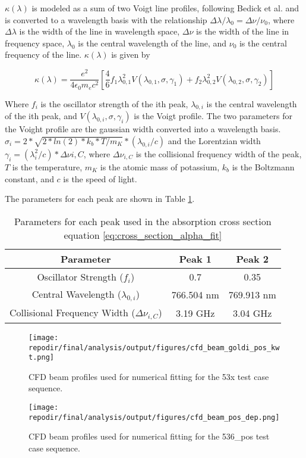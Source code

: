 $\kappa(\lambda)$ is modeled as a sum of two Voigt line profiles, following Bedick et al.\cite{bedickDeterminationElectricalConductivity2019} and is converted to a wavelength basis with the relationship $\Delta \lambda/\lambda_0 = \Delta \nu/\nu_0$, where $\Delta \lambda$ is the width of the line in wavelength space, $\Delta \nu$ is the width of the line in frequency space, $\lambda_0$ is the central wavelength of the line, and $\nu_0$ is the central frequency of the line. $\kappa(\lambda)$ is given by

\begin{equation}
    \label{eq:cross_section_alpha_fit}
    \kappa(\lambda) = \frac{e^2}{4 \epsilon_0 m_e c^2} \left[ \frac{4}{6} f_1 \lambda_{0,1}^2 V(\lambda_{0,1},\sigma,\gamma_1) + f_2 \lambda_{0,2}^2 V(\lambda_{0,2},\sigma,\gamma_2) \right]
\end{equation}

Where $f_i$ is the oscillator strength of the ith peak, $\lambda_{0,i}$ is the central wavelength of the ith peak, and $V(\lambda_{0,i},\sigma,\gamma_i)$ is the Voigt profile. The two parameters for the Voight profile are the gaussian width converted into a wavelength basis.  $\sigma_i = 2*\sqrt{2*ln(2)*k_b*T/m_K}*(\lambda_{0,i}/c)$ and the Lorentzian width $\gamma_i = (\lambda_i^2/c)*\Delta \nu{i,C}$, where $\Delta \nu_{i,C}$ is the collisional frequency width of the peak, $T$ is the temperature, $m_K$ is the atomic mass of potassium, $k_b$ is the Boltzmann constant, and $c$ is the speed of light.

The parameters for each peak are shown in Table \ref{table:peak_parameters}. 

\begin{table}[H]
\centering
\begin{tabular}{|c|c|c|}
\hline
Parameter & Peak 1 & Peak 2 \\
\hline
Oscillator Strength ($f_i$) & 0.7 & 0.35 \\
Central Wavelength ($\lambda_{0,i}$) & 766.504 nm & 769.913 nm \\
Collisional Frequency Width ($\Delta \nu_{i,C}$) & 3.19 GHz & 3.04 GHz \\
\hline
\end{tabular}
\caption{Parameters for each peak used in the absorption cross section equation \ref{eq:cross_section_alpha_fit}}
\label{table:peak_parameters}
\end{table}


\begin{figure}[]
    \centering
    \texttt{[image: \\repodir/final/analysis/output/figures/cfd\_beam\_goldi\_pos\_kwt.png]}
    \caption{CFD beam profiles used for numerical fitting for the 53x test case sequence.  }
    \label{fig:SI_cfd_beam_goldi_pos_kwt}

    \texttt{[image: \\repodir/final/analysis/output/figures/cfd\_beam\_pos\_dep.png]}
    \caption{CFD beam profiles used for numerical fitting for the 536\_pos test case sequence.}
    \label{fig:SI_cfd_beam_pos_dep}
\end{figure}


